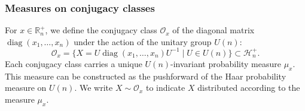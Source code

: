 \documentclass[notitlepage, 11pt, letterpaper]{amsart}
\theoremstyle{plain}
\theoremstyle{definition}
\DeclareMathOperator{\diag}{diag}
\newcommand{\orbit}{\mathcal O}
\newcommand{\hermp}[1]{\mathcal H^{+}_{#1}}
\newcommand{\eigsp}[1]{\mathbb R^{+}_{#1}}
\begin{document}
\subsubsection{Measures on conjugacy classes}
For $x \in \eigsp{n}$, we define the conjugacy class $\orbit_x$ of the diagonal matrix
$\diag(x_1, \ldots, x_n)$ under the action of the unitary group $U(n)$:
\begin{equation}
    \orbit_x = \{ X = U\diag(x_1, \ldots, x_n)U^{-1} \mid U \in U(n)\} \subset \hermp{n}.
\end{equation}
Each conjugacy class carries a unique $U(n)$-invariant probability measure $\mu_x$.
This measure can be constructed as the pushforward of the Haar probability measure on $U(n)$.
We write $X \sim \orbit_x$ to indicate $X$ distributed according to the measure $\mu_x$.
\end{document}
